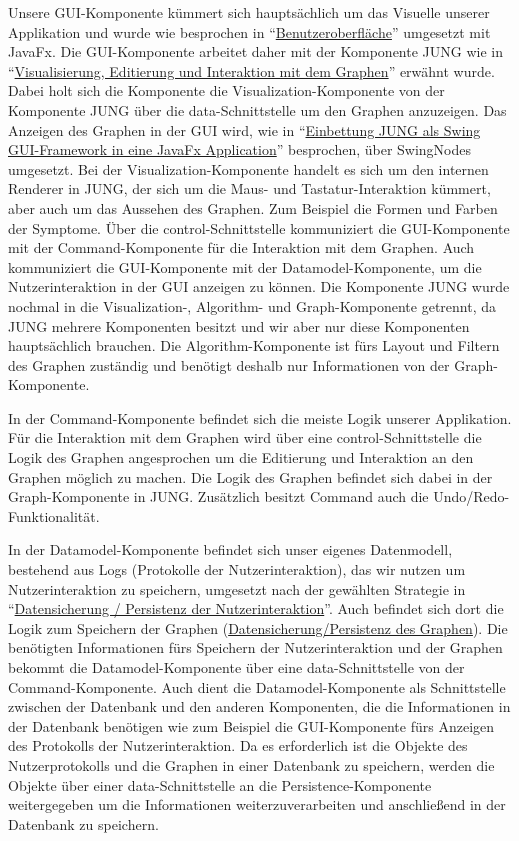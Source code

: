 \documentclass[enabledeprecatedfontcommands,fontsize=11pt,paper=a4,twoside]{scrartcl}
\newcounter{one}
\begin{document}
Unsere GUI-Komponente kümmert sich hauptsächlich um das Visuelle unserer Applikation und wurde wie besprochen in “\hyperlink{kkk}{Benutzeroberfläche}” umgesetzt mit JavaFx. Die GUI-Komponente arbeitet daher mit der Komponente JUNG wie in “\hyperlink{eee}{Visualisierung, Editierung und Interaktion mit dem Graphen}” erwähnt wurde. Dabei holt sich die Komponente die Visualization-Komponente von der Komponente JUNG über die data-Schnittstelle um den Graphen anzuzeigen. Das Anzeigen des Graphen in der GUI wird, wie in “\hyperlink{lll}{Einbettung JUNG als Swing GUI-Framework in eine JavaFx Application}” besprochen, über SwingNodes umgesetzt. Bei der Visualization-Komponente handelt es sich um den internen Renderer in JUNG, der sich um die Maus- und Tastatur-Interaktion kümmert, aber auch um das Aussehen des Graphen. Zum Beispiel die Formen und Farben der Symptome. Über die control-Schnittstelle kommuniziert die GUI-Komponente mit der Command-Komponente für die Interaktion mit dem Graphen. Auch kommuniziert die GUI-Komponente mit der Datamodel-Komponente, um die Nutzerinteraktion in der GUI anzeigen zu können. Die Komponente JUNG wurde nochmal in die Visualization-, Algorithm- und Graph-Komponente getrennt, da JUNG mehrere Komponenten besitzt und wir aber nur diese Komponenten hauptsächlich brauchen. Die Algorithm-Komponente ist fürs Layout und Filtern des Graphen zuständig und benötigt deshalb nur Informationen von der Graph-Komponente.

In der Command-Komponente befindet sich die meiste Logik unserer Applikation. Für die Interaktion mit dem Graphen wird über eine control-Schnittstelle die Logik des Graphen angesprochen um die Editierung und Interaktion an den Graphen möglich zu machen. Die Logik des Graphen befindet sich dabei in der Graph-Komponente in JUNG. Zusätzlich besitzt Command auch die Undo/Redo-Funktionalität.

In der Datamodel-Komponente befindet sich unser eigenes Datenmodell, bestehend aus Logs (Protokolle der Nutzerinteraktion), das wir nutzen um Nutzerinteraktion zu speichern, umgesetzt nach der gewählten Strategie in “\hyperlink{aaa}{Datensicherung / Persistenz der Nutzerinteraktion}”. Auch befindet sich dort die Logik zum Speichern der Graphen (\hyperlink{yy}{Datensicherung/Persistenz des Graphen}). Die benötigten Informationen fürs Speichern der Nutzerinteraktion und der Graphen bekommt die Datamodel-Komponente über eine data-Schnittstelle von der Command-Komponente.
Auch dient die Datamodel-Komponente als Schnittstelle zwischen der Datenbank und den anderen Komponenten, die die Informationen in der Datenbank benötigen wie zum Beispiel die GUI-Komponente fürs Anzeigen des Protokolls der Nutzerinteraktion.
Da es erforderlich ist die Objekte des Nutzerprotokolls und die Graphen in einer Datenbank zu speichern, werden die Objekte über einer data-Schnittstelle an die Persistence-Komponente weitergegeben um die Informationen weiterzuverarbeiten und anschließend in der Datenbank zu speichern. \\ \\
\end{document}

